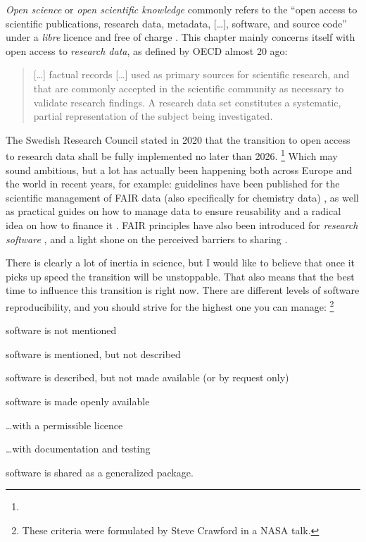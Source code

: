 \documentclass[webedition,openright,titles,swedish,english]{LuaUUThesis}\usepackage[]{graphicx}\usepackage[]{xcolor}
\begin{document}
\emph{Open science} or \emph{open scientific knowledge} commonly refers to the
\enquote{open  access  to  scientific  publications, research  data,  metadata,
[\ldots], software, and source code} under a \emph{libre} licence and
free of charge \cite{KungligaBiblioteket2023,UNESCO2021}.
This chapter mainly concerns itself with open access to \emph{research data},
as defined by OECD \cite{OECD2007} almost \qty{20}{\years} ago:

\blockquote{%
   [\ldots] factual records [\ldots] used as primary sources for scientific research,
   and that are commonly accepted in the scientific community as necessary to validate
   research findings. A research data set constitutes a systematic, partial representation
   of the subject being investigated.}

The Swedish Research Council stated in 2020 that
the transition to open access to research data shall be fully implemented no later
than 2026.%
\footnote{}
Which may sound ambitious, but a lot has actually been happening both across Europe
and the world in recent years, for example:
guidelines have been published for the scientific management of FAIR data
(also specifically for chemistry data)
\cite{McEwen2023,Scheffler2022,Lamprecht2020,KungligaBiblioteket2019,Wilkinson2016},
as well as practical guides on how to manage data to ensure reusability \cite{Borgman2022}
and a radical idea on how to finance it \cite{Mons2020}.
FAIR principles have also been introduced for \emph{research software} \cite{Barker2022},
and a light shone on the perceived barriers to sharing \cite{Gomes2022}.

There is clearly a lot of inertia in science, but I would like to believe that
once it picks up speed the transition will be unstoppable.
That also means that the best time to influence this transition is right now.
There are different levels of software reproducibility, and you should strive for
the highest one you can manage:%
\footnote{These criteria were formulated by Steve Crawford  in a NASA talk.}
\begin{enumerate*}[label=(\roman*),itemjoin={{; }},itemjoin*={{; and }}]
   \item software is not mentioned
   \item software is mentioned, but not described
   \item software is described, but not made available (or by request only)
   \item software is made openly available
   \item \ldots with a permissible licence
   \item \ldots with documentation and testing
   \item software is shared as a generalized package.
\end{enumerate*}
\end{document}
